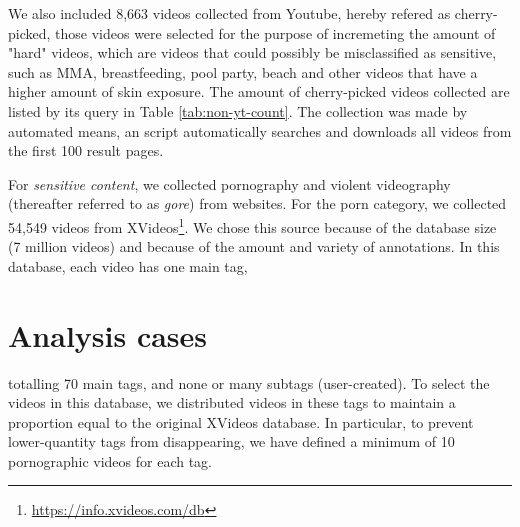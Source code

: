 We also included 8,663 videos collected from Youtube, hereby refered as cherry-picked, those videos were selected for the purpose of incremeting the amount of "hard" videos, which are videos that could possibly be misclassified as sensitive, such as MMA, breastfeeding, pool party, beach and other videos that have a higher amount of skin exposure. The amount of cherry-picked videos collected are listed by its query in Table \ref{tab:non-yt-count}. The collection was made by automated means, an script automatically searches and downloads all videos from the first 100 result pages.



For \textit{sensitive content}, we collected pornography and violent videography (thereafter referred to as \textit{gore}) from websites. For the porn category, we collected 54,549 videos from XVideos\footnote{\url{https://info.xvideos.com/db}}. We chose this source because of the database size (7 million videos) and because of the amount and variety of annotations. In this database, each video has one main tag,\section{Analysis cases}\label{sec:experiments-discussion}

 totalling 70 main tags, and none or many subtags (user-created). To select the videos in this database, we distributed videos in these tags to maintain a proportion equal to the original XVideos database. In particular, to prevent lower-quantity tags from disappearing, we have defined a minimum of 10 pornographic videos for each tag. 

